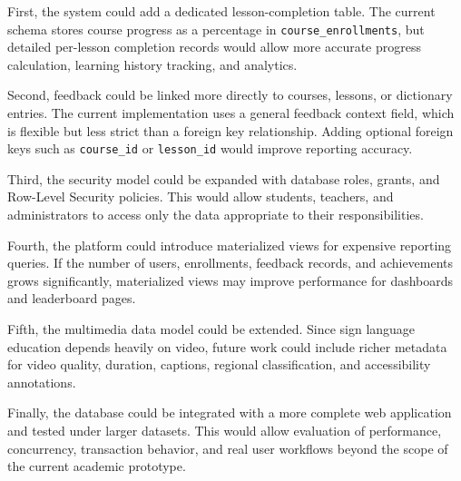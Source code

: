 First, the system could add a dedicated lesson-completion table. The current schema stores course progress as a percentage in \texttt{course\_enrollments}, but detailed per-lesson completion records would allow more accurate progress calculation, learning history tracking, and analytics.

Second, feedback could be linked more directly to courses, lessons, or dictionary entries. The current implementation uses a general feedback context field, which is flexible but less strict than a foreign key relationship. Adding optional foreign keys such as \texttt{course\_id} or \texttt{lesson\_id} would improve reporting accuracy.

Third, the security model could be expanded with database roles, grants, and Row-Level Security policies. This would allow students, teachers, and administrators to access only the data appropriate to their responsibilities.

Fourth, the platform could introduce materialized views for expensive reporting queries. If the number of users, enrollments, feedback records, and achievements grows significantly, materialized views may improve performance for dashboards and leaderboard pages.

Fifth, the multimedia data model could be extended. Since sign language education depends heavily on video, future work could include richer metadata for video quality, duration, captions, regional classification, and accessibility annotations.

Finally, the database could be integrated with a more complete web application and tested under larger datasets. This would allow evaluation of performance, concurrency, transaction behavior, and real user workflows beyond the scope of the current academic prototype.
